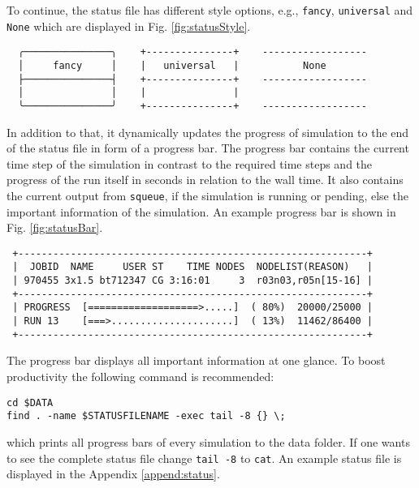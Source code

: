 To continue, the status file has different style options, e.g., \texttt{fancy}, \texttt{universal} and \texttt{None} which are displayed in Fig. \ref{fig:statusStyle}. 
\begin{center}
\captionsetup{type=figure}
\begin{verbatim}
  ╭───────────────╮    +---------------+    ------------------
  │     fancy     │    |   universal   |           None
  ├───────────────┤    +---------------+    ------------------
  │               │    |               |    
  ╰───────────────╯    +---------------+    ------------------
\end{verbatim}
\label{fig:statusStyle}
\end{center}
In addition to that, it dynamically updates the progress of simulation to the end of the status file in form of a progress bar. The progress bar contains the current time step of the simulation in contrast to the required time steps and the progress of the run itself in seconds in relation to the wall time. It also contains the current output from \texttt{squeue}, if the simulation is running or pending, else the important information of the simulation. An example progress bar is shown in Fig. \ref{fig:statusBar}.
\begin{center}
\captionsetup{type=figure}
\begin{verbatim}
 +------------------------------------------------------------+
 |  JOBID  NAME     USER ST    TIME NODES  NODELIST(REASON)   |
 | 970455 3x1.5 bt712347 CG 3:16:01     3  r03n03,r05n[15-16] |
 +------------------------------------------------------------+
 | PROGRESS  [===================>.....]  ( 80%)  20000/25000 |
 | RUN 13    [===>.....................]  ( 13%)  11462/86400 |
 +------------------------------------------------------------+
\end{verbatim}
\label{fig:statusBar}
\end{center}
The progress bar displays all important information at one glance. To boost productivity the following command is recommended:
\begin{lstlisting}
cd $DATA 
find . -name $STATUSFILENAME -exec tail -8 {} \;
\end{lstlisting}
which prints all progress bars of every simulation to the data folder. If one wants to see the complete status file change \texttt{tail -8} to \texttt{cat}.
An example status file is displayed in the Appendix \ref{append:status}.

